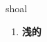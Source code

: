 
\begin{frame}
{\huge shoal}
\begin{center}
\begin{enumerate}\Large
  \item \textbf{浅的}
\end{enumerate}
\end{center}
\end{frame}
